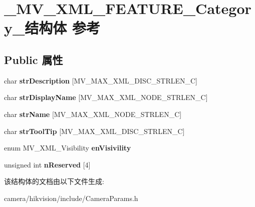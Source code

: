 \hypertarget{struct___m_v___x_m_l___f_e_a_t_u_r_e___category__}{}\section{\+\_\+\+M\+V\+\_\+\+X\+M\+L\+\_\+\+F\+E\+A\+T\+U\+R\+E\+\_\+\+Category\+\_\+结构体 参考}
\label{struct___m_v___x_m_l___f_e_a_t_u_r_e___category__}
\subsection*{Public 属性}
\begin{DoxyCompactItemize}
\item 
\mbox{\label{struct___m_v___x_m_l___f_e_a_t_u_r_e___category___a3c1cd639385eae2dd0e35eee534cf8ab}} 
char {\bfseries str\+Description} \mbox{[}M\+V\+\_\+\+M\+A\+X\+\_\+\+X\+M\+L\+\_\+\+D\+I\+S\+C\+\_\+\+S\+T\+R\+L\+E\+N\+\_\+C\mbox{]}
\item 
\mbox{\label{struct___m_v___x_m_l___f_e_a_t_u_r_e___category___a82d21457a8be9268f3bb5db6112d4a66}} 
char {\bfseries str\+Display\+Name} \mbox{[}M\+V\+\_\+\+M\+A\+X\+\_\+\+X\+M\+L\+\_\+\+N\+O\+D\+E\+\_\+\+S\+T\+R\+L\+E\+N\+\_\+C\mbox{]}
\item 
\mbox{\label{struct___m_v___x_m_l___f_e_a_t_u_r_e___category___a7e561f80d50cbf102812b1a7f1eccf72}} 
char {\bfseries str\+Name} \mbox{[}M\+V\+\_\+\+M\+A\+X\+\_\+\+X\+M\+L\+\_\+\+N\+O\+D\+E\+\_\+\+S\+T\+R\+L\+E\+N\+\_\+C\mbox{]}
\item 
\mbox{\label{struct___m_v___x_m_l___f_e_a_t_u_r_e___category___af1f46053a352c2e0ea78bde8876eb632}} 
char {\bfseries str\+Tool\+Tip} \mbox{[}M\+V\+\_\+\+M\+A\+X\+\_\+\+X\+M\+L\+\_\+\+D\+I\+S\+C\+\_\+\+S\+T\+R\+L\+E\+N\+\_\+C\mbox{]}
\item 
\mbox{\label{struct___m_v___x_m_l___f_e_a_t_u_r_e___category___a6311d0a3105db376ad242dce7c8e8bbf}} 
enum M\+V\+\_\+\+X\+M\+L\+\_\+\+Visibility {\bfseries en\+Visivility}
\item 
\mbox{\label{struct___m_v___x_m_l___f_e_a_t_u_r_e___category___abb1c55f243cb6895381e088dbebe2bf2}} 
unsigned int {\bfseries n\+Reserved} \mbox{[}4\mbox{]}
\end{DoxyCompactItemize}


该结构体的文档由以下文件生成\+:\begin{DoxyCompactItemize}
\item 
camera/hikvision/include/Camera\+Params.\+h\end{DoxyCompactItemize}
